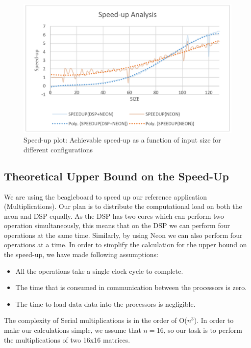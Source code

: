 \begin{figure}[h!]
\includegraphics[width=\textwidth]{analysis/speedup_plot}
\caption{Speed-up plot: Achievable speed-up as a function of input size for different configurations}
\label{fig:speedup_plot}
\end{figure}

\subsection{Theoretical Upper Bound on the Speed-Up}
We are using the beagleboard to speed up our reference application (Multiplications). Our plan is to distribute the computational load on both the neon and DSP equally. As the DSP has two cores which can perform two operation simultaneously, this means that on the DSP we can perform four operations at the same time. Similarly, by using Neon we can also perform four operations at a time. In order to simplify the calculation for the upper bound on the speed-up, we have made following assumptions:

\begin{itemize}
\item All the operations take a single clock cycle to complete.
\item The time that is consumed in communication between the processors is zero.
\item The time to load data data into the processors is negligible.
\end{itemize}

The complexity of Serial multiplications is in the order of O($n^3$). In order to make our calculations simple, we assume that $n = 16$, so our task is to perform the multiplications of two 16x16 matrices.

